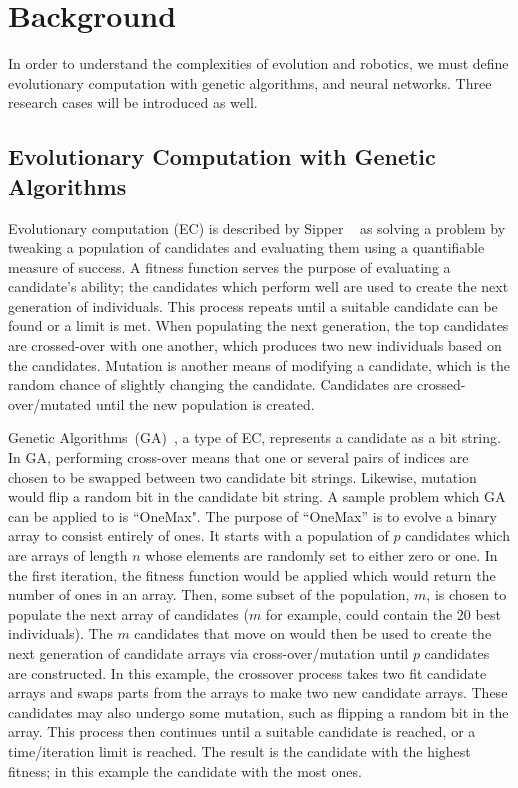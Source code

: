 \documentclass{sig-alternate}
\begin{document}
 
\section{Background}\label{background}
In order to understand the complexities of evolution and robotics, we must define evolutionary computation with genetic algorithms, and neural networks. Three research cases will be introduced as well.

 \subsection{Evolutionary Computation with Genetic Algorithms}\label{background EC}
  Evolutionary computation (EC) is described by Sipper ~\cite{Sipper2011Win} as solving a problem by tweaking a population of candidates and evaluating them using a quantifiable measure of success. A fitness function serves the purpose of evaluating a candidate's ability; the candidates which perform well are used to create the next generation of individuals.  This process repeats until a suitable candidate can be found or a limit is met. When populating the next generation, the top candidates are crossed-over with one another, which produces two new individuals based on the candidates. Mutation is another means of modifying a candidate, which is the random chance  of slightly changing the candidate. Candidates are crossed-over/mutated until the new population is created. 

Genetic Algorithms~(GA)~\cite{wiki:GeneticAlgorithms}, a type of EC, represents a candidate as a bit string. In GA, performing cross-over means that one or several pairs of indices are chosen to be swapped between two candidate bit strings. Likewise, mutation would flip a random bit in the candidate bit string. A sample problem which GA can be applied to is ``OneMax". The purpose of ``OneMax'' is to evolve a binary array to consist entirely of ones. It starts with a population of $p$ candidates which are arrays of length $n$ whose elements are randomly set to either zero or one. In the first iteration, the fitness function would be applied which would return the number of ones in an array. Then, some subset of the population, $m$, is chosen to populate the next array of candidates ($m$ for example, could contain the 20 best individuals). The $m$ candidates that move on would then be used to create the next generation of candidate arrays via cross-over/mutation until $p$ candidates are constructed. In this example, the crossover process takes two fit candidate arrays and swaps parts from the arrays to make two new candidate arrays. These candidates may also undergo some mutation, such as flipping a random bit in the array. This process then continues until a suitable candidate is reached, or a time/iteration limit is reached. The result is the candidate with the highest fitness; in this example the candidate with the most ones.
  
\end{document}
